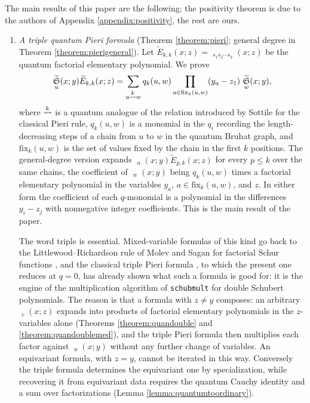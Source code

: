 \documentclass{amsart}
\theoremstyle{definition}
\theoremstyle{remark}
\numberwithin{equation}{section}
\DeclareMathOperator{\qsch}{\widetilde{\mathfrak{S}}}
\newcommand{\xrightsquigarrow}[2][]{%
	\mathrel{\mathop{\rightsquigarrow}\limits^{\scriptstyle #2}%
	\ifx\hfuzz#1\hfuzz\else_{\scriptstyle #1}\fi}%
}
\newcommand{\tom}[1]{\ensuremath{\xrightsquigarrow{#1}}}
\newcommand{\fx}{\mathrm{fix}}
\newcommand{\qelem}{\widetilde{E}}
\begin{document}
The main results of this paper are the following; the positivity theorem is due to the authors of Appendix \ref{appendix:positivity}, the rest are ours.
\begin{enumerate}
\item \emph{A triple quantum Pieri formula} (Theorem \ref{theorem:pieri}; general degree in Theorem \ref{theorem:pierigeneral}). Let $\qelem_{k,k}(x;z)=\qsch_{s_1s_2\cdots s_k}(x;z)$ be the quantum factorial elementary polynomial. We prove
$$\qsch_u(x;y)\qelem_{k,k}(x;z)=\sum_{u\tom{k} w}q_k(u,w)\prod_{a\in\fx_k(u,w)}(y_a-z_1)\,\qsch_w(x;y),$$
where $\tom{k}$ is a quantum analogue of the relation introduced by Sottile \cite{sottile} for the classical Pieri rule, $q_k(u,w)$ is a monomial in the $q_i$ recording the length-decreasing steps of a chain from $u$ to $w$ in the quantum Bruhat graph, and $\fx_k(u,w)$ is the set of values fixed by the chain in the first $k$ positions. The general-degree version expands $\qsch_u(x;y)\qelem_{p,k}(x;z)$ for every $p\leq k$ over the same chains, the coefficient of $\qsch_w(x;y)$ being $q_k(u,w)$ times a factorial elementary polynomial in the variables $y_a$, $a\in\fx_k(u,w)$, and $z$. In either form the coefficient of each $q$-monomial is a polynomial in the differences $y_i-z_j$ with nonnegative integer coefficients. This is the main result of the paper.

The word triple is essential. Mixed-variable formulas of this kind go back to the Littlewood--Richardson rule of Molev and Sagan for factorial Schur functions \cite{molev1999littlewood}, and the classical triple Pieri formula \cite[Theorem~7.1]{samuelmolev}, to which the present one reduces at $q=0$, has already shown what such a formula is good for: it is the engine of the multiplication algorithm of \texttt{schubmult} for double Schubert polynomials. The reason is that a formula with $z\neq y$ composes: an arbitrary $\qsch_v(x;z)$ expands into products of factorial elementary polynomials in the $z$-variables alone (Theorems \ref{theorem:quandouble} and \ref{theorem:quandoublemed}), and the triple Pieri formula then multiplies each factor against $\qsch_u(x;y)$ without any further change of variables. An equivariant formula, with $z=y$, cannot be iterated in this way. Conversely the triple formula determines the equivariant one by specialization, while recovering it from equivariant data requires the quantum Cauchy identity and a sum over factorizations (Lemma \ref{lemma:quantumtoordinary}).


\end{enumerate}
\end{document}
